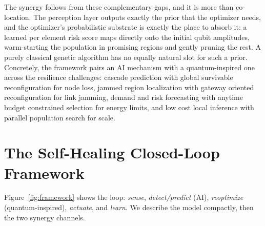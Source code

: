 \documentclass[journal]{IEEEtran}
\begin{document}
The synergy follows from these complementary gaps, and it is more than co-location. The perception layer outputs exactly the prior that the optimizer needs, and the optimizer's probabilistic substrate is exactly the place to absorb it: a learned per element risk score maps directly onto the initial qubit amplitudes, warm-starting the population in promising regions and gently pruning the rest. A purely classical genetic algorithm has no equally natural slot for such a prior. Concretely, the framework pairs an AI mechanism with a quantum-inspired one across the resilience challenges: cascade prediction with global survivable reconfiguration for node loss, jammed region localization with gateway oriented reconfiguration for link jamming, demand and risk forecasting with anytime budget constrained selection for energy limits, and low cost local inference with parallel population search for scale.

\section{The Self-Healing Closed-Loop Framework}\label{sec:framework}

Figure~\ref{fig:framework} shows the loop: \emph{sense}, \emph{detect/predict} (AI), \emph{reoptimize} (quantum-inspired), \emph{actuate}, and \emph{learn}. We describe the model compactly, then the two synergy channels.
\end{document}
